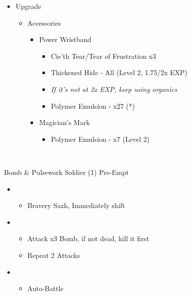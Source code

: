 	\begin{upgrade}
		\begin{itemize}
			\item Upgrade
			      \begin{itemize}
				      \item Accessories
				            \begin{itemize}
					            \item Power Wristband
					                  \begin{itemize}
						                  \item Cie'th Tear/Tear of Frustration x3
						                  \item Thickened Hide - All (Level 2, 1.75/2x EXP)
						                  \item \textit{If it's not at 2x EXP, keep using organics}
						                  \item Polymer Emulsion - x27 (*)
					                  \end{itemize}
					            \item Magician's Mark
					                  \begin{itemize}
						                  \item Polymer Emulsion - x7 (Level 2)
					                  \end{itemize}
				            \end{itemize}
			      \end{itemize}
		\end{itemize}
	\end{upgrade}

	\vfill
	\ 
	\begin{battle}[0:19]{Bomb \& Pulsework Soldier (1) Pre-Empt}
		\begin{itemize}
			\item \second
			      \begin{itemize}
				      \item Bravery Sazh, Immediately shift
			      \end{itemize}
			\item \third
			      \begin{itemize}
				      \item Attack x3 Bomb, if not dead, kill it first
				      \item Repeat 2  Attacks
			      \end{itemize}
			\item \first
			      \begin{itemize}
				      \item Auto-Battle
			      \end{itemize}
		\end{itemize}
	\end{battle}

